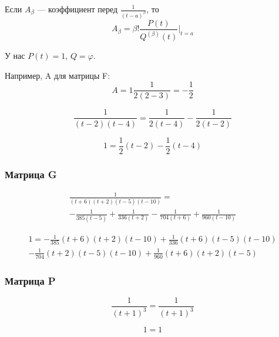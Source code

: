 \documentclass[12pt, a4paper]{article}
\begin{document}
    Если $A_\beta$ — коэффициент перед $\frac{1}{(t - a)^\beta}$, то
    \begin{equation}
        A_\beta = \beta ! \frac{P(t)}{Q^{(\beta)}(t)}{\Bigr |}_{t=a}
    \end{equation}

    У нас $P(t) = 1$, $Q = \varphi$.

    Например, A для матрицы F:
    \begin{equation}
        A = 1 \frac{1}{2(2 - 3)} = -\frac{1}{2}
    \end{equation}

    \begin{equation}
        \frac{1}{(t - 2)(t - 4)} = \frac{1}{2 (t - 4)} - \frac{1}{2 (t - 2)}
    \end{equation}

    \begin{equation}
        1 = \frac{1}{2} (t - 2) - \frac{1}{2} (t - 4)
    \end{equation}

    \subsubsection{Матрица G}

    \begin{multline}
        \frac{1}{(t + 6)(t + 2)(t - 5)(t- 10)} = \\
        -\frac{1}{385 (t - 5)} + \frac{1}{336 (t + 2)} - \frac{1}{704 (t + 6)} + \frac{1}{960 (t - 10)}
    \end{multline}
    
    \begin{multline}
        1 = -\frac{1}{385} (t + 6)(t + 2)(t- 10) + \frac{1}{336} (t + 6)(t - 5)(t- 10) \\
        - \frac{1}{704} (t + 2)(t - 5)(t- 10)+ \frac{1}{960} (t + 6)(t + 2)(t - 5)
    \end{multline}

    \subsubsection{Матрица P}

    \begin{equation}
        \frac{1}{(t + 1)^3} = \frac{1}{(t + 1)^3}
    \end{equation}

    \begin{equation}
        1 = 1
    \end{equation}
\end{document}
